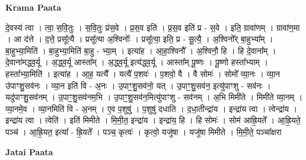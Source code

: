 \documentclass[17pt]{extarticle}
\begin{document}
\textbf{Krama Paata} \newline

दे॒वस्य॑ त्वा । त्वा॒ स॒वि॒तुः । स॒वि॒तुः प्र॑स॒वे । प्र॒स॒व इति॑ । प्र॒स॒व इति॑ प्र - स॒वे । इति॒ ग्रावा॑णम् । ग्रावा॑ण॒मा । आ द॑त्ते । द॒त्ते॒ प्रसू᳚त्यै । प्रसू᳚त्या अ॒श्विनोः᳚ । प्रसू᳚त्या॒ इति॒ प्र - सू॒त्यै॒ । अ॒श्विनो᳚र् बा॒हुभ्या᳚म् । बा॒हुभ्या॒मिति॑ । बा॒हुभ्या॒मिति॑ बा॒हु - भ्या॒म् । इत्या॑ह । आ॒हा॒श्विनौ᳚ । अ॒श्विनौ॒ हि । हि दे॒वाना᳚म् । दे॒वाना॑मद्ध्व॒र्यू । अ॒द्ध्व॒र्यू आस्ता᳚म् । अ॒द्ध्व॒र्यू इत्य॑द्ध्व॒र्यू । आस्ता᳚म् पू॒ष्णः । पू॒ष्णो हस्ता᳚भ्याम् । हस्ता᳚भ्या॒मिति॑ । इत्या॑ह । आ॒ह॒ यत्यै᳚ । यत्यै॑ प॒शवः॑ । प॒शवो॒ वै । वै सोमः॑ । सोमो᳚ व्या॒नः । व्या॒न उ॑पाꣳशु॒सव॑नः । व्या॒न इति॑ वि - अ॒नः । उ॒पाꣳ॒॒शु॒सव॑नो॒ यत् । उ॒पाꣳ॒॒शु॒सव॑न॒ इत्यु॑पाꣳशु - सव॑नः । यदु॑पाꣳशु॒सव॑नम् । उ॒पाꣳ॒॒शु॒सव॑नम॒भि । उ॒पाꣳ॒॒शु॒सव॑न॒मित्यु॑पाꣳशु - सव॑नम् । अ॒भि मिमी॑ते । मिमी॑ते व्या॒नम् । व्या॒नमे॒व । व्या॒नमिति॑ वि - अ॒नम् । ए॒व प॒शुषु॑ । प॒शुषु॑ दधाति । द॒धा॒तीन्द्रा॑य । इन्द्रा॑य त्वा । त्वेन्द्रा॑य । इन्द्रा॑य त्वा । त्वेति॑ । इति॑ मिमीते । मि॒मी॒त॒ इन्द्रा॑य । इन्द्रा॑य॒ हि । हि सोमः॑ । सोम॑ आह्रि॒यते᳚ । आ॒ह्रि॒यते॒ पञ्च॑ । आ॒ह्रि॒यत॒ इत्या᳚ - ह्रि॒यते᳚ । पञ्च॒ कृत्वः॑ । कृत्वो॒ यजु॑षा । यजु॑षा मिमीते । मि॒मी॒ते॒ पञ्चा᳚क्षरा \newline

\textbf{Jatai Paata} \newline
\end{document}
